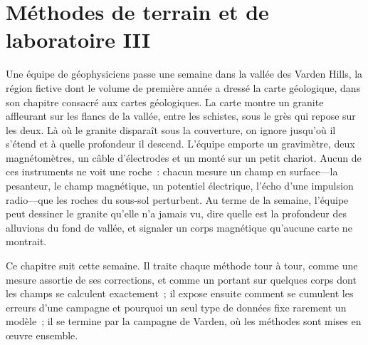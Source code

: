 \chapter{Méthodes de terrain et de laboratoire III}\label{ch:b3:field-lab-methods-3}

Une équipe de géophysiciens passe une semaine dans la vallée des Varden Hills, la
région fictive dont le volume de première année a dressé la carte géologique, dans son
chapitre consacré aux cartes géologiques. La carte montre un granite affleurant sur les
flancs de la vallée, entre les schistes, sous le grès qui repose sur les deux. Là où le
granite disparaît sous la couverture, on ignore jusqu'où il s'étend et à quelle
profondeur il descend. L'équipe emporte un gravimètre, deux magnétomètres, un câble
d'électrodes et un  monté sur un petit chariot. Aucun de ces instruments ne voit
une roche~: chacun mesure un champ en surface---la pesanteur, le champ magnétique, un
potentiel électrique, l'écho d'une impulsion radio---que les roches du sous-sol
perturbent. Au terme de la semaine, l'équipe peut dessiner le granite qu'elle n'a jamais
vu, dire quelle est la profondeur des alluvions du fond de vallée,
et signaler un corps magnétique
qu'aucune carte ne montrait.

Ce chapitre suit cette semaine. Il traite chaque méthode tour à tour, comme une mesure
assortie de ses corrections, et comme un  portant sur quelques corps
dont les champs se calculent exactement~; il expose ensuite comment se cumulent les erreurs
d'une campagne et pourquoi un seul type de données fixe rarement un modèle~; il se termine
par la campagne de Varden, où les méthodes sont mises
en œuvre ensemble.

